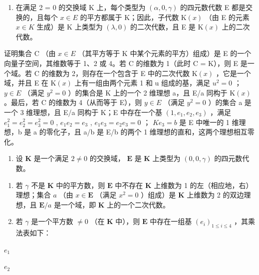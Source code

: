 \begin{enumerate}
\def\labelenumi{\arabic{enumi}.}
\setcounter{enumi}{4}
\tightlist
\item
  在满足 2 = 0 的交换域 K 上，每个类型为 \((\alpha, 0, \gamma)\) 的四元数代数 E 都是交换的，且每个 \(x \in E\) 的平方都属于 K；因此，子代数 \(\mathrm{K}(x)\) （由 E 的元素 \(x \in K\) 生成）是 K 上类型为 \((\lambda, 0)\) 的二次代数，且 E 是 \(\mathrm{K}(x)\) 上的二次代数。
\end{enumerate}

证明集合 C （由 \(x \in E\) （其平方等于 K 中某个元素的平方）组成）是 E 的一个向量子空间，其维数等于 1、2 或 4。若 C 的维数为 1（此时 C = K），则 E 是一个域。若 C 的维数为 2，则存在一个包含于 E 中的二次代数 \(\mathrm{K}(x)\) ，它是一个域，并且 E 在 \(\mathrm{K}(x)\) 上有一组由两个元素 1 和 u 组成的基，满足 \(u^{2} = 0\) ； \(y \in E\) （满足 \(y^{2} = 0\) ）的集合是 K 上的一个 2 维理想 a，且 E/a 同构于 \(\mathrm{K}(x)\) 。最后，若 C 的维数为 4（从而等于 E），则 \(y \in E\) （满足 \(y^{2} = 0\) ）的集合 a 是一个 3 维理想，且 E/a 同构于 K；E 中存在一个基 \((1, e_{1}, e_{2}, e_{3})\) ，满足 \(e_{1}^{2} = e_{2}^{2} = e_{3}^{2} = 0\) , \(e_{1}e_{2} = e_{3}\) , \(e_{1}e_{3} = e_{2}e_{3} = 0\) ； \(Ke_{3} = b\) 是 E 中唯一的 1 维理想，b 是 a 的零化子，且 a/b 是 E/b 的两个 1 维理想的直和，这两个理想相互零化。

\begin{enumerate}
\def\labelenumi{\arabic{enumi}.}
\setcounter{enumi}{5}
\tightlist
\item
  设 \(\mathbf{K}\) 是一个满足 \(2 \neq 0\) 的交换域， \(\mathbf{E}\) 是 \(\mathbf{K}\) 上类型为 \((0, 0, \gamma)\) 的四元数代数。
\end{enumerate}

\begin{enumerate}
\def\labelenumi{(\alph{enumi})}
\item
  若 \(\gamma\) 不是 \(\mathbf{K}\) 中的平方数，则 \(\mathbf{E}\) 中不存在 \(\mathbf{K}\) 上维数为 1 的左（相应地，右）理想；集合 \(a\) （由 \(x \in \mathbf{E}\) （满足 \(x^2 = 0\) ）组成）是 \(\mathbf{K}\) 上维数为 2 的双边理想，且 \(\mathbf{E} / a\) 是一个域，即 \(\mathbf{K}\) 上的一个二次代数。
\item
  若 \(\gamma\) 是一个平方数 \(\neq 0\) （在 \(\mathbf{K}\) 中），则 \(\mathbf{E}\) 中存在一组基 \((e_i)_{1\leq i\leq 4}\) ，其乘法表如下：
\end{enumerate}

\(e_1\)

\(e_2\)

